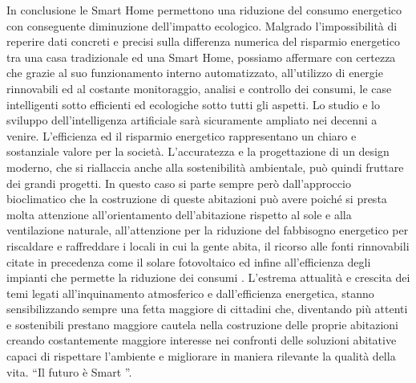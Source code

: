 In conclusione le Smart Home permettono una riduzione del consumo energetico con conseguente diminuzione dell’impatto ecologico. Malgrado l’impossibilità di reperire dati concreti e precisi sulla differenza numerica del risparmio energetico tra una casa tradizionale ed una Smart Home, possiamo affermare con certezza che grazie al suo funzionamento interno automatizzato, all’utilizzo di energie rinnovabili ed al costante monitoraggio, analisi e controllo dei consumi, le case intelligenti sotto efficienti ed ecologiche sotto tutti gli aspetti. Lo studio e lo sviluppo dell’intelligenza artificiale sarà sicuramente ampliato nei decenni a venire.  L’efficienza ed il risparmio energetico rappresentano un chiaro e sostanziale valore per la società. L’accuratezza e la progettazione di un design moderno, che si riallaccia anche alla sostenibilità ambientale, può quindi fruttare dei grandi progetti. In questo caso si parte sempre però dall’approccio bioclimatico che la costruzione di queste abitazioni può avere poiché si presta molta attenzione all’orientamento dell’abitazione rispetto al sole e alla ventilazione naturale, all’attenzione per la riduzione del fabbisogno energetico per riscaldare e raffreddare i locali in cui la gente abita, il ricorso alle fonti rinnovabili citate in precedenza come il solare fotovoltaico ed infine all’efficienza degli impianti che permette la riduzione dei consumi .
L’estrema attualità e crescita dei temi legati all’inquinamento atmosferico e dall’efficienza energetica, stanno sensibilizzando sempre una fetta maggiore di cittadini che, diventando più attenti e sostenibili prestano maggiore cautela nella costruzione delle proprie abitazioni creando costantemente maggiore interesse nei confronti delle soluzioni abitative capaci di rispettare l’ambiente e migliorare in maniera rilevante la qualità della vita. “Il futuro è Smart ”.
